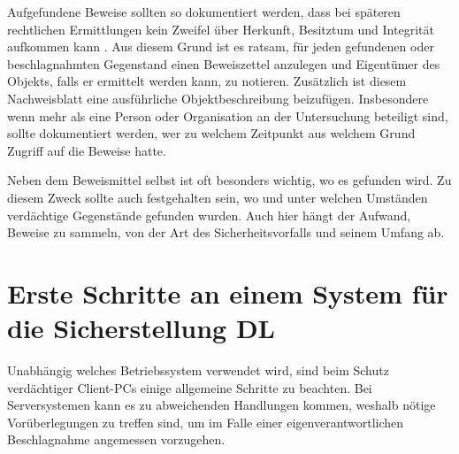\documentclass[12pt,DIV=14, version=first, BCOR=10mm,a4paper,twoside,parskip=half-,headsepline,headinclude]{scrartcl}
\begin{document}
    Aufgefundene Beweise sollten so dokumentiert werden, dass bei späteren rechtlichen Ermittlungen kein Zweifel über Herkunft, Besitztum und Integrität aufkommen kann \cite[vgl. S. 85]{texbook01}. 
    Aus diesem Grund ist es ratsam, für jeden gefundenen oder beschlagnahmten Gegenstand einen Beweiszettel anzulegen und Eigentümer des Objekts, falls er ermittelt werden kann, zu notieren. Zusätzlich ist diesem Nachweisblatt eine ausführliche Objektbeschreibung beizufügen. Insbesondere wenn mehr als eine Person oder Organisation an der Untersuchung beteiligt sind, sollte dokumentiert werden, wer zu welchem Zeitpunkt aus welchem Grund Zugriff auf die Beweise hatte.

    Neben dem Beweismittel selbst ist oft besonders wichtig, wo es gefunden wird. Zu diesem Zweck sollte auch festgehalten sein, wo und unter welchen Umständen verdächtige Gegenstände gefunden wurden. Auch hier hängt der Aufwand, Beweise zu sammeln, von der Art des Sicherheitsvorfalls und seinem Umfang ab.

\section {Erste Schritte an einem System für die Sicherstellung DL} 
Unabhängig welches Betriebssystem verwendet wird, sind beim Schutz verdächtiger Client-PCs einige allgemeine Schritte zu beachten. Bei Serversystemen kann es zu abweichenden Handlungen kommen, weshalb nötige Vorüberlegungen zu treffen sind, um im Falle einer eigenverantwortlichen Beschlagnahme angemessen vorzugehen.
\end{document}
